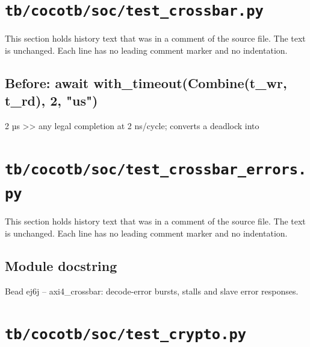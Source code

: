 \section{\texttt{tb/cocotb/soc/test\_crossbar.py}}\label{cr:suite:soc-test-crossbar}

This section holds history text that was in a comment of the source file. The text is unchanged. Each line has no leading comment marker and no indentation.

\begin{record}

\subsection*{Before: await with\_timeout(Combine(t\_wr, t\_rd), 2, "us")}

\begin{textblock}
2 µs >> any legal completion at 2 ns/cycle; converts a deadlock into
\end{textblock}

\end{record}

\section{\texttt{tb/cocotb/soc/test\_crossbar\_errors.py}}\label{cr:suite:soc-test-crossbar-errors}

This section holds history text that was in a comment of the source file. The text is unchanged. Each line has no leading comment marker and no indentation.

\begin{record}

\subsection*{Module docstring}

\begin{textblock}
Bead ej6j -- axi4_crossbar: decode-error bursts, stalls and slave error responses.
\end{textblock}

\end{record}

\section{\texttt{tb/cocotb/soc/test\_crypto.py}}\label{cr:suite:soc-test-crypto}

